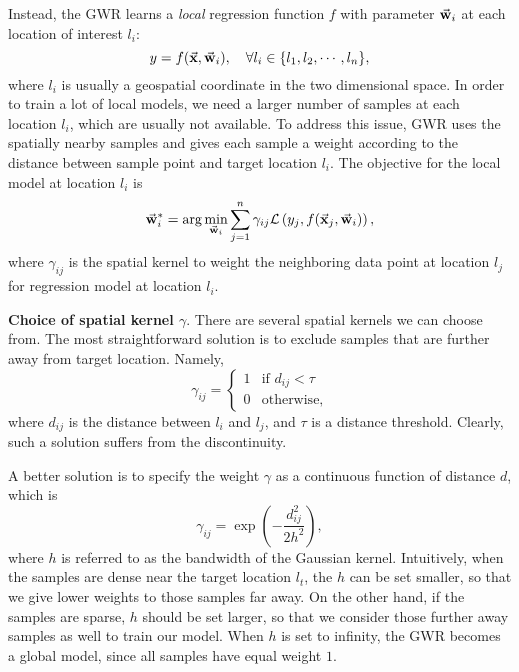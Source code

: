 Instead, the GWR learns a \emph{local} regression function $f$ with parameter $\vec{\mathbf{w}}_i$ at each location of interest $l_i$: 
\begin{equation}
\label{eq:gwrs}
y = f(\vec{\mathbf{x}}, \vec{\mathbf{w}}_i),  \quad \forall l_i \in \{l_1, l_2, \cdots, l_n\},
\end{equation}
where $l_i$ is usually a geospatial coordinate in the two dimensional space. In order to train a lot of local models, we need a larger number of samples at each location $l_i$, which are usually not available. To address this issue, GWR uses the spatially nearby samples and gives each sample a weight according to the distance between sample point and target location $l_i$. The objective for the local model at location $l_i$ is 
\begin{equation}
\label{eq:gwr-general}
\vec{\mathbf{w}}_i^* = \arg\min_{\vec{\mathbf{w}}_i} \sum_{j=1}^n  \gamma_{ij} \mathcal{L} \left(y_j, f(\vec{\mathbf{x}}_j, \vec{\mathbf{w}}_i) \right),
\end{equation}
where $\gamma_{ij}$ is the spatial kernel to weight the neighboring data point at location $l_j$ for regression model at location $l_i$.


\textbf{Choice of spatial kernel $\gamma$}. There are several spatial kernels we can choose from. The most straightforward solution is to exclude samples that are further away from target location. Namely,
\begin{equation}
\gamma_{ij} = \left\{ \begin{array}{ll}  1 & \text{if $d_{ij} < \tau$} \\  0 & \text{otherwise,} \end{array} \right.
\end{equation}
where $d_{ij}$ is the distance between $l_i$ and $l_j$, and $\tau$ is a distance threshold. Clearly, such a solution suffers from the discontinuity. 

A better solution is to specify the weight $\gamma$ as a continuous function of distance $d$, which is
\begin{equation}
\label{eq:gwr-gkn}
\gamma_{ij} = \exp\left( -\frac{d_{ij}^2}{2h^2} \right),
\end{equation} 
where $h$ is referred to as the bandwidth of the Gaussian kernel. Intuitively, when the samples are dense near the target location $l_t$, the $h$ can be set smaller, so that we give lower weights to those samples far away. On the other hand, if the samples are sparse, $h$ should be set larger, so that we consider those further away samples as well to train our model. When $h$ is set to infinity, the GWR becomes a global model, since all samples have equal weight $1$. 


